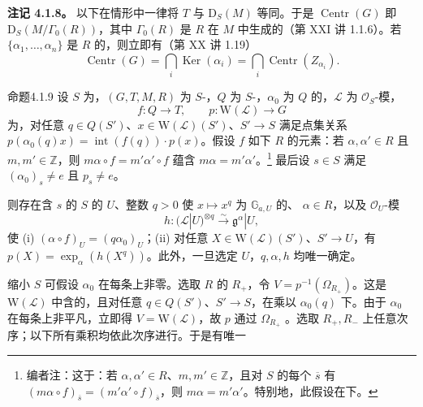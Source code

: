 \textbf{注记 4.1.8。} 以下在情形中一律将 $T$ 与 $\mathrm D_S(M)$ 等同。于是 $\operatorname{Centr}(G)$ 即 $\mathrm D_S(M/\Gamma_0(R))$，其中 $\Gamma_0(R)$ 是 $R$ 在 $M$ 中生成的（第 XXI 讲 1.1.6）。若 $\{\alpha_1,\ldots,\alpha_n\}$ 是 $R$ 的，则立即有（第 XX 讲 1.19）
\[\operatorname{Centr}(G)=\bigcap_i\operatorname{Ker}(\alpha_i)=\bigcap_i\operatorname{Centr}(Z_{\alpha_i}).\]
\begin{SGAresult}{命题}{4.1.9} 设 $S$ 为，$(G,T,M,R)$ 为 $S$-，$Q$ 为 $S$-，$\alpha_0$ 为 $Q$ 的，$\mathcal L$ 为 $\mathcal O_S$-模，
\[f:Q\longrightarrow T,\qquad p:\mathrm W(\mathcal L)\longrightarrow G\]
为，对任意 $q\in Q(S')$、$x\in\mathrm W(\mathcal L)(S')$、$S'\to S$ 满足点集关系 $p(\alpha_0(q)x)=\operatorname{int}(f(q))\cdot p(x)$。假设 $f$ 如下 $R$ 的元素：若 $\alpha,\alpha'\in R$ 且 $m,m'\in\mathbb Z$，则 $m\alpha\circ f=m'\alpha'\circ f$ 蕴含 $m\alpha=m'\alpha'$。\footnote{编者注：这于：若 $\alpha,\alpha'\in R$、$m,m'\in\mathbb Z$，且对 $S$ 的每个 $\overline s$ 有 $(m\alpha\circ f)_{\overline s}=(m'\alpha'\circ f)_{\overline s}$，则 $m\alpha=m'\alpha'$。特别地，此假设在下。} 最后设 $s\in S$ 满足 $(\alpha_0)_s\ne e$ 且 $p_s\ne e$。

则存在含 $s$ 的 $S$ 的 $U$、整数 $q>0$ 使 $x\mapsto x^q$ 为 $\mathbb G_{a,U}$ 的、 $\alpha\in R$，以及 $\mathcal O_U$-模
\[h:(\mathcal L|U)^{\otimes q}\xrightarrow\sim\mathfrak g^\alpha|U,\]
使 (i) $(\alpha\circ f)_U=(q\alpha_0)_U$；(ii) 对任意 $X\in\mathrm W(\mathcal L)(S')$、$S'\to U$，有 $p(X)=\exp_\alpha(h(X^q))$。此外，一旦选定 $U$，$q,\alpha,h$ 均唯一确定。
\end{SGAresult}
缩小 $S$ 可假设 $\alpha_0$ 在每条上非零。选取 $R$ 的 $R_+$，令 $V=p^{-1}(\Omega_{R_+})$。这是 $\mathrm W(\mathcal L)$ 中含的，且对任意 $q\in Q(S')$、$S'\to S$，在乘以 $\alpha_0(q)$ 下。由于 $\alpha_0$ 在每条上非平凡，立即得 $V=\mathrm W(\mathcal L)$，故 $p$ 通过 $\Omega_{R_+}$ 。选取
$R_+,R_-$ 上任意次序；以下所有乘积均依此次序进行。于是有唯一
